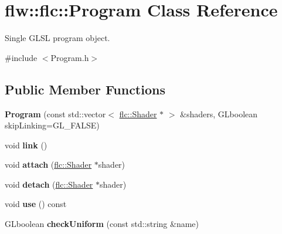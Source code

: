 \hypertarget{classflw_1_1flc_1_1Program}{}\section{flw\+:\+:flc\+:\+:Program Class Reference}
\label{classflw_1_1flc_1_1Program}


Single G\+L\+SL program object.  




{\ttfamily \#include $<$Program.\+h$>$}

\subsection*{Public Member Functions}
\begin{DoxyCompactItemize}
\item 
{\bfseries Program} (const std\+::vector$<$ \hyperlink{classflw_1_1flc_1_1Shader}{flc\+::\+Shader} $\ast$ $>$ \&shaders, G\+Lboolean skip\+Linking=G\+L\+\_\+\+F\+A\+L\+SE)\hypertarget{classflw_1_1flc_1_1Program_a56a35b8e7b6d81f591f67dfe24a4d660}{}\label{classflw_1_1flc_1_1Program_a56a35b8e7b6d81f591f67dfe24a4d660}

\item 
void {\bfseries link} ()\hypertarget{classflw_1_1flc_1_1Program_a520ce30c0932e26ea8478ca0e328e2c3}{}\label{classflw_1_1flc_1_1Program_a520ce30c0932e26ea8478ca0e328e2c3}

\item 
void {\bfseries attach} (\hyperlink{classflw_1_1flc_1_1Shader}{flc\+::\+Shader} $\ast$shader)\hypertarget{classflw_1_1flc_1_1Program_a9ad2cbaff11970a08cfce8828e4dee10}{}\label{classflw_1_1flc_1_1Program_a9ad2cbaff11970a08cfce8828e4dee10}

\item 
void {\bfseries detach} (\hyperlink{classflw_1_1flc_1_1Shader}{flc\+::\+Shader} $\ast$shader)\hypertarget{classflw_1_1flc_1_1Program_a57618797187b09f2fbfff68a1d3643b4}{}\label{classflw_1_1flc_1_1Program_a57618797187b09f2fbfff68a1d3643b4}

\item 
void {\bfseries use} () const \hypertarget{classflw_1_1flc_1_1Program_a4c5f95bace46189eeb5a15299a63bfb5}{}\label{classflw_1_1flc_1_1Program_a4c5f95bace46189eeb5a15299a63bfb5}

\item 
G\+Lboolean {\bfseries check\+Uniform} (const std\+::string \&name)\hypertarget{classflw_1_1flc_1_1Program_ac98053fec99f6bc361f515664748bcf7}{}\label{classflw_1_1flc_1_1Program_ac98053fec99f6bc361f515664748bcf7}


\end{DoxyCompactItemize}
